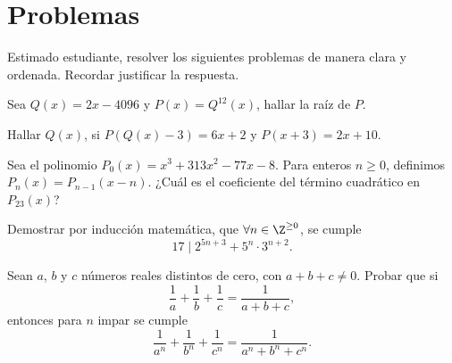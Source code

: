 \section*{\large Problemas}

Estimado estudiante, resolver los siguientes problemas de manera clara y ordenada.
Recordar justificar la respuesta.


\begin{problem}
    Sea $Q(x) = 2x - 4096$ y $P(x) = Q^{12}(x)$, hallar la raíz de $P$.
\end{problem}

\begin{problem}
    Hallar $Q(x)$, si $P\left(Q(x) - 3\right) = 6x + 2$ y $P(x + 3) = 2x + 10$.
\end{problem}

\begin{problem}
    Sea el polinomio $P_0(x) = x^3 + 313x^2 - 77x - 8$.
    Para enteros $n \geq 0$, definimos $P_n(x) = P_{n - 1}(x - n)$.
    ¿Cuál es el coeficiente del término cuadrático en $P_{23}(x)$?
\end{problem}

\begin{problem}
    Demostrar por inducción matemática, que $\forall n \in \Z^{\geq 0}$, se cumple
    \[17 \mid 2^{5n + 3} + 5^n \cdot 3^{n + 2}.\]
\end{problem}

\begin{problem}
    Sean $a$, $b$ y $c$ números reales distintos de cero, con $a + b + c \neq 0$.
    Probar que si
    \[\frac{1}{a} + \frac{1}{b} + \frac{1}{c} = \frac{1}{a + b + c},\]
    entonces para $n$ impar se cumple
    \[\frac{1}{a^n} + \frac{1}{b^n} + \frac{1}{c^n} = \frac{1}{a^n + b^n + c^n}.\]
\end{problem}


